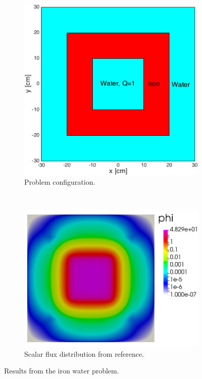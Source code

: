 \documentclass[review]{elsarticle}
\begin{document}
\begin{figure}[ht!]
	\begin{subfigure}{.5\textwidth}
		\centering
		\hspace*{-2cm}\includegraphics[width=.95\linewidth]{iw-config.png}
		\caption{Problem configuration.}
		\label{f:config}
	\end{subfigure}
	~
	\begin{subfigure}{.5\textwidth}
		\centering
		\hspace*{-0cm}\includegraphics[width=1.1\linewidth]{iw-pp}
		\caption{Scalar flux distribution from reference.}
		\label{f:pcolor}
	\end{subfigure}
	\caption{Results from the iron water problem.}
	\label{f:iron-water}
\end{figure}
\end{document}
